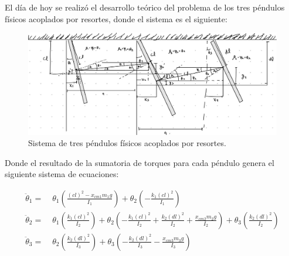 El día de hoy se realizó el desarrollo teórico del problema de los tres péndulos
físicos acoplados por resortes, donde el sistema es el siguiente:

\begin{figure}[htbp!]
  \centering
  \includegraphics[width=0.8\linewidth]{Figures/IM1.jpeg}
  \caption{Sistema de tres péndulos físicos acoplados por resortes.}
  \label{fig:sistema_pendulos}
\end{figure}


Donde el resultado de la sumatoria de torques para cada péndulo genera el siguiente sistema de ecuaciones:

\begin{equation}
  \begin{aligned}
    \ddot{\theta}_1 =\; & \theta_1 \left( \frac{(cl)^2 - x_{cm1} m_1 g}{I_1} \right) + \theta_2 \left( -\frac{k_1 (cl)^2}{I_1} \right) \\
    \ddot{\theta}_2 =\; & \theta_1 \left( \frac{k_1 (cl)^2}{I_2} \right) + \theta_2 \left( -\frac{k_1 (cl)^2}{I_2} + \frac{k_2 (dl)^2}{I_2} + \frac{x_{cm2} m_2 g}{I_2} \right) + \theta_3 \left( \frac{k_2 (dl)^2}{I_2} \right) \\
    \ddot{\theta}_3 =\; & \theta_2 \left( \frac{k_2 (dl)^2}{I_3} \right) + \theta_3 \left( -\frac{k_2 (dl)^2}{I_3} - \frac{x_{cm3} m_3 g}{I_3} \right)
  \end{aligned}
\end{equation}
